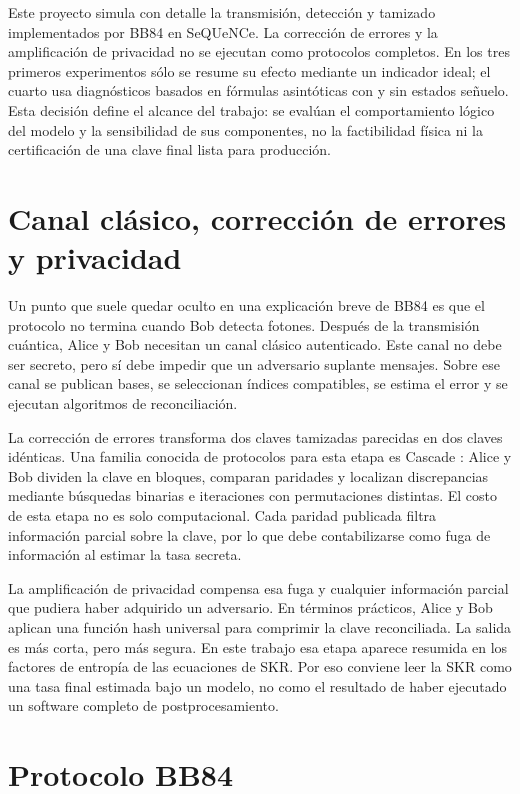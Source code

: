 Este proyecto simula con detalle la transmisión, detección y tamizado implementados por BB84 en SeQUeNCe. La corrección de errores y la amplificación de privacidad no se ejecutan como protocolos completos. En los tres primeros experimentos sólo se resume su efecto mediante un indicador ideal; el cuarto usa diagnósticos basados en fórmulas asintóticas con y sin estados señuelo. Esta decisión define el alcance del trabajo: se evalúan el comportamiento lógico del modelo y la sensibilidad de sus componentes, no la factibilidad física ni la certificación de una clave final lista para producción.

\section{Canal clásico, corrección de errores y privacidad}

Un punto que suele quedar oculto en una explicación breve de BB84 es que el protocolo no termina cuando Bob detecta fotones. Después de la transmisión cuántica, Alice y Bob necesitan un canal clásico autenticado. Este canal no debe ser secreto, pero sí debe impedir que un adversario suplante mensajes. Sobre ese canal se publican bases, se seleccionan índices compatibles, se estima el error y se ejecutan algoritmos de reconciliación.

La corrección de errores transforma dos claves tamizadas parecidas en dos claves idénticas. Una familia conocida de protocolos para esta etapa es Cascade \cite{brassardCascade1994}: Alice y Bob dividen la clave en bloques, comparan paridades y localizan discrepancias mediante búsquedas binarias e iteraciones con permutaciones distintas. El costo de esta etapa no es solo computacional. Cada paridad publicada filtra información parcial sobre la clave, por lo que debe contabilizarse como fuga de información al estimar la tasa secreta.

La amplificación de privacidad compensa esa fuga y cualquier información parcial que pudiera haber adquirido un adversario. En términos prácticos, Alice y Bob aplican una función hash universal para comprimir la clave reconciliada. La salida es más corta, pero más segura. En este trabajo esa etapa aparece resumida en los factores de entropía de las ecuaciones de SKR. Por eso conviene leer la SKR como una tasa final estimada bajo un modelo, no como el resultado de haber ejecutado un software completo de postprocesamiento.

\section{Protocolo BB84}

